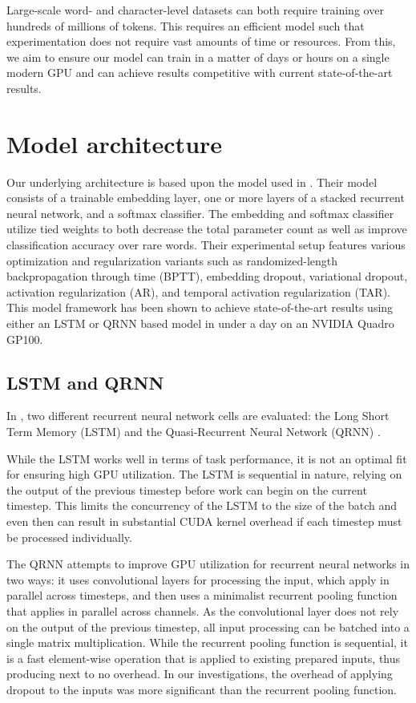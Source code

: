 \documentclass{article}
\begin{document}
Large-scale word- and character-level datasets can both require training over hundreds of millions of tokens.
This requires an efficient model such that experimentation does not require vast amounts of time or resources.
From this, we aim to ensure our model can train in a matter of days or hours on a single modern GPU and can achieve results competitive with current state-of-the-art results.

\section{Model architecture}

Our underlying architecture is based upon the model used in \citet{merity2018regularizing}.
Their model consists of a trainable embedding layer, one or more layers of a stacked recurrent neural network, and a softmax classifier.
The embedding and softmax classifier utilize tied weights \cite{Inan2016,Press2016} to both decrease the total parameter count as well as improve classification accuracy over rare words.
Their experimental setup features various optimization and regularization variants such as randomized-length backpropagation through time (BPTT),
embedding dropout, variational dropout, activation regularization (AR), and
temporal activation regularization (TAR).
This model framework has been shown to achieve state-of-the-art results using either an LSTM or QRNN based model in under a day on an NVIDIA Quadro GP100.

\subsection{LSTM and QRNN}

In \citet{merity2018regularizing}, two different recurrent neural network cells are evaluated: the Long Short Term Memory (LSTM) \citep{Hochreiter1997LongSM} and the Quasi-Recurrent Neural Network (QRNN) \citep{Bradbury2016}.

While the LSTM works well in terms of task performance, it is not an optimal fit for ensuring high GPU utilization.
The LSTM is sequential in nature, relying on the output of the previous timestep before work can begin on the current timestep.
This limits the concurrency of the LSTM to the size of the batch and even then can result in substantial CUDA kernel overhead if each timestep must be processed individually.

The QRNN attempts to improve GPU utilization for recurrent neural networks in two ways: it uses convolutional layers for processing the input, which apply in parallel across timesteps, and then uses a minimalist recurrent pooling function that applies in parallel across channels.
As the convolutional layer does not rely on the output of the previous timestep, all input processing can be batched into a single matrix multiplication.
While the recurrent pooling function is sequential, it is a fast element-wise operation that is applied to existing prepared inputs, thus producing next to no overhead.
In our investigations, the overhead of applying dropout to the inputs was more significant than the recurrent pooling function.
\end{document}
